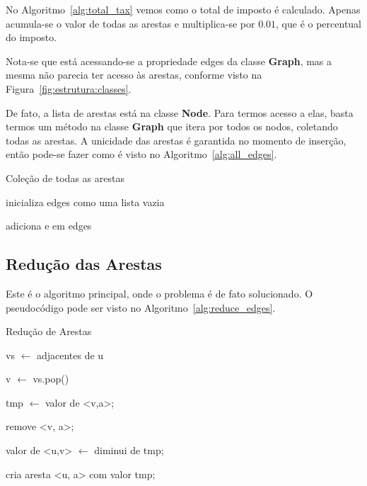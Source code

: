\documentclass[12pt]{article}
\begin{document}
No Algoritmo~\ref{alg:total_tax} vemos como o total de imposto é
calculado. Apenas acumula-se o valor de todas as arestas e multiplica-se por
$0.01$, que é o percentual do imposto.

Nota-se que está acessando-se a propriedade \textsf{edges} da classe
\textsf{\textbf{Graph}}, mas a mesma não parecia ter acesso às arestas, conforme
visto na Figura~\ref{fig:estrutura:classes}.

De fato, a lista de arestas está na classe \textsf{\textbf{Node}}. Para termos
acesso a elas, basta termos um método na classe \textsf{\textbf{Graph}} que
itera por todos os nodos, coletando todas as arestas. A unicidade das arestas é
garantida no momento de inserção, então pode-se fazer como é visto no Algoritmo~\ref{alg:all_edges}.

\begin{algorithm}[H]
  \caption{Coleção de todas as arestas}
  \label{alg:all_edges}
  inicializa edges como uma lista vazia

  {
    {
      adiciona e em edges
    }
  }

\end{algorithm}

\subsection{Redução das Arestas}\label{sec:algoritmo:reduce}

Este é o algoritmo principal, onde o problema é de fato solucionado. O
pseudocódigo pode ser visto no Algoritmo~\ref{alg:reduce_edges}.

\begin{algorithm}[H]
  \caption{Redução de Arestas}
  \label{alg:reduce_edges}
  {
    vs $\gets$ adjacentes de u

    {
      v $\gets$ vs.pop() 
      {
        {
          tmp $\gets$ valor de <v,a>;

          remove <v, a>;

          valor de <u,v> $\gets$ diminui de tmp;

          cria aresta <u, a> com valor tmp;
        }
      }
    }
  }
\end{algorithm}
\end{document}
